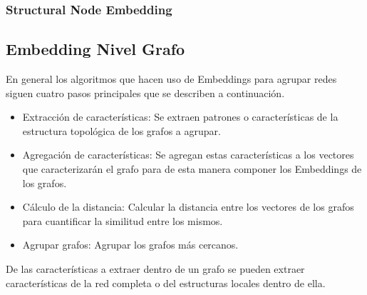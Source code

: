 \subsubsection{Structural Node Embedding}

\begin{comment}
    \begin{center}
    \begin{tabular}{ |p{8cm}|p{2cm}|  }
    \hline
    \multicolumn{2}{|c|}{Structural Node Embedding} \\
    \hline
    Paper & Algoritmo  \\
    \hline
    “Learning Structural Node Embeddings Via Diffusion Wavelets” & GraphWave  \\
    \hline
    “Learning Role-based Graph Embeddings” & Role2Vec \\
    \hline
    \end{tabular}
    \end{center}
\end{comment}


\subsection{Embedding Nivel Grafo}

En general los algoritmos que hacen uso de Embeddings para agrupar redes siguen cuatro pasos principales que se describen a continuación.

\begin{itemize}
    \item Extracción de características: Se extraen patrones o características de la estructura topológica de los grafos a agrupar.
    
    \item Agregación de características: Se agregan estas características a los vectores que caracterizarán el grafo para de esta manera componer los Embeddings de los grafos.
    
    \item Cálculo de la distancia: Calcular la distancia entre los vectores de los grafos para cuantificar la similitud entre los mismos.
    
    \item Agrupar grafos: Agrupar los grafos más cercanos.
\end{itemize}

De las características a extraer dentro de un grafo se pueden extraer características de la red completa o del estructuras locales dentro de ella.


